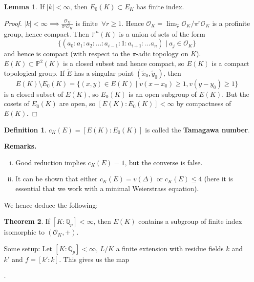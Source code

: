 \documentclass{article}
\theoremstyle{definition}
\newtheorem{theorem}{Theorem}[section]
\newtheorem{lemma}[theorem]{Lemma}
\newtheorem{defn}{Definition}[section]
\begin{document}
\begin{lemma}\label{lemma9.6}
    If $\left|k\right|<\infty$, then $E_0(K)\subset E_K$ has finite index.
\end{lemma}
\begin{proof}
    $\left|k\right|<\infty \implies \frac{\mathcal{O}_K}{\pi^r \mathcal{O}_K}$ is finite $~\forall r\ge 1$. Hence $\mathcal{O}_K = \lim_{\stackrel{\leftarrow}{r} } \mathcal{O}_K/\pi^r \mathcal{O}_K$ is a profinite group, hence compact. Then $\mathbb{P}^n(K)$ is a union of sets of the form \[
    \{(a_0:a_1:a_2:\ldots:a_{i-1}:1:a_{i+1}:\ldots a_n) \mid a_j \in \mathcal{O}_K\}
    \]
    and hence is compact (with respect to the $\pi$-adic topology on $K$). $E(K) \subset \mathbb{P}^2(K)$ is a closed subset and hence compact, so $E(K)$ is a compact topological group. If $\widetilde{E}$ has a singular point $(\widetilde{x}_0,\widetilde{y}_0)$, then \[
    E(K) \setminus E_0(K) = \{(x,y) \in E(K) \mid v(x-x_0)\ge 1,v(y-y_0)\ge 1\}
    \]
    is a closed subset of $E(K)$, so $E_0(K)$ is an open subgroup of $E(K)$. But the cosets of $E_0(K)$ are open, so $[E(K):E_0(K)]<\infty$ by compactness of $E(K)$.
\end{proof}
\begin{defn}
    $c_K(E) = [E(K):E_0(K)]$ is called the \textbf{Tamagawa number}.
\end{defn}
\textbf{Remarks.}
\begin{enumerate}[(i)]
    \item Good reduction implies $c_K(E)=1$, but the converse is false.
    \item It can be shown that either $c_K(E) = v(\Delta)$ or $c_K(E)\le 4$ (here it is essential that we work with a minimal Weierstrass equation). 
\end{enumerate} 
We hence deduce the following:
\begin{theorem}\label{theorem9.7}
    If $[K:\mathbb{Q}_p]<\infty$, then $E(K)$ contains a subgroup of finite index isomorphic to $(\mathcal{O}_K,+)$.
\end{theorem}
\vspace{1mm}
 
Some setup: Let $[K:\mathbb{Q}_p]<\infty$, $L/K$ a finite extension with residue fields $k$ and $k'$ and $f = [k':k]$. This gives us the map 
.
\vspace{1mm}
\end{document}
